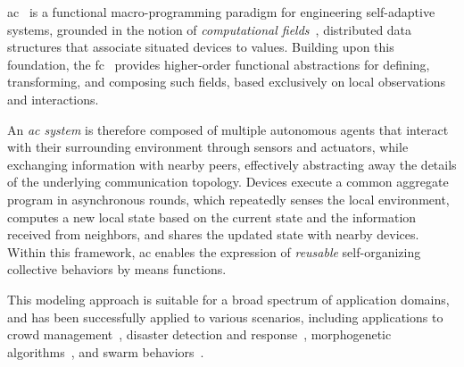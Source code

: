 \documentclass[runningheads]{llncs}
\begin{document}
\ac{ac}~\cite{DBLP:journals/computer/BealPV15} is a functional macro-programming paradigm for engineering self-adaptive systems,
grounded in the notion of \emph{computational fields}~\cite{DBLP:journals/tosem/MameiZ09},
distributed data structures that associate situated devices to values.
%
Building upon this foundation,
the \ac{fc}~\cite{DBLP:journals/tocl/AudritoVDPB19}
provides higher-order functional abstractions
for defining, transforming, and composing such fields,
based exclusively on local observations and interactions.

An \emph{\ac{ac} system} is therefore composed of multiple autonomous agents
that interact with their surrounding environment through sensors and actuators,
while exchanging information with nearby peers,
effectively abstracting away the details of the underlying communication topology.
%
Devices execute a common aggregate program in asynchronous rounds,
which repeatedly senses the local environment,
computes a new local state based on the current state and the information received from neighbors,
and shares the updated state with nearby devices.
%
Within this framework,
\ac{ac} enables the expression of \emph{reusable} self-organizing collective behaviors by means functions.

This modeling approach is suitable for a broad spectrum of application domains,
and has been successfully applied to various scenarios,
including applications to crowd management~\cite{DBLP:journals/computer/BealPV15},
disaster detection and response~\cite{DBLP:journals/internet/AguzziCPV22},
morphogenetic algorithms~\cite{Cortecchia2025CAIS},
and swarm behaviors~\cite{DBLP:conf/coordination/AguzziCV23}.
\end{document}
